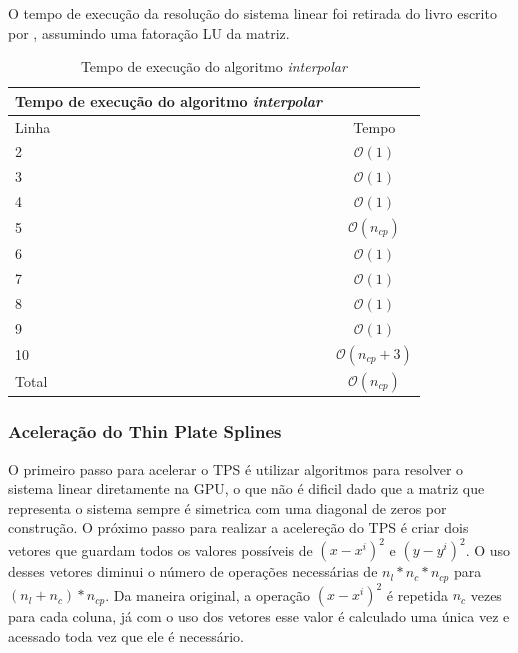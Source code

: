   O tempo de execução da resolução do sistema linear foi retirada do livro escrito por 
\cite[Part~IV]{trefethen1997numerical}, assumindo uma fatoração LU da matriz.

\begin{table}[H]
\begin{center}
\begin{tabular}{l|c}
\hline
Tempo de execução do algoritmo \textit{interpolar} \\
\hline
Linha&Tempo\\
\hline
2       &$\mathcal{O}(1)$ \\
3       &$\mathcal{O}(1)$ \\
4       &$\mathcal{O}(1)$\\
5       &$\mathcal{O}(n_{cp})$\\
6       &$\mathcal{O}(1)$\\
7       &$\mathcal{O}(1)$\\
8       &$\mathcal{O}(1)$\\
9       &$\mathcal{O}(1)$\\
10      &$\mathcal{O}(n_{cp}+3)$\\
\hline
Total   &$\mathcal{O}(n_{cp})$\\
\hline
\end{tabular}
\caption{Tempo de execução do algoritmo \textit{interpolar}}
\label{table:interpolar}
\end{center}
\end{table}

\subsubsection{Aceleração do Thin Plate Splines}

    O primeiro passo para acelerar o TPS é utilizar algoritmos para resolver o sistema linear diretamente na GPU, o que
não é dificil dado que a matriz que representa o sistema sempre é simetrica com uma diagonal de zeros por construção. O
próximo passo para realizar a acelereção do TPS é criar dois vetores que guardam todos os valores possíveis de $(x-x^i)^2$
e $(y-y^i)^2$. O uso desses vetores diminui o número de operações necessárias de $n_l*n_c*n_{cp}$ para $(n_l+n_c)*n_{cp}$.
Da maneira original, a operação $(x-x^i)^2$ é repetida $n_c$ vezes para cada coluna, já com o uso dos vetores esse valor
é calculado uma única vez e acessado toda vez que ele é necessário.


